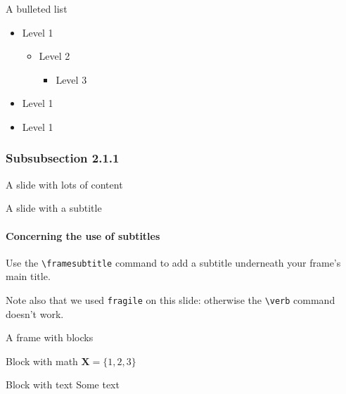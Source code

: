 \documentclass[12pt, t]{beamer}
\begin{document}
\begin{frame}{A bulleted list}
    \begin{itemize}
        \item Level 1
        \begin{itemize}
            \item Level 2
            \begin{itemize}
                \item Level 3
            \end{itemize}
        \end{itemize}
		\item Level 1
		\item Level 1
    \end{itemize}
\end{frame}



\subsubsection{Subsubsection 2.1.1}

\begin{frame}{A slide with lots of content}
    \lipsum[2]
\end{frame}

\begin{frame}[fragile]{A slide with a subtitle}
  \framesubtitle{Concerning the use of subtitles}

  Use the \verb#\framesubtitle# command to add a subtitle
  underneath your frame's main title.

  \vfill

  Note also that we used \verb#fragile# on this slide: otherwise
  the \verb#\verb# command doesn't work.
\end{frame}

\begin{frame}[c]{A frame with blocks}
	\begin{block}{Block with math}
		$\mathbf{X} = \{1, 2, 3\}$
	\end{block}
	\begin{block}{Block with text}
		Some text
	\end{block}
\end{frame}
\end{document}
